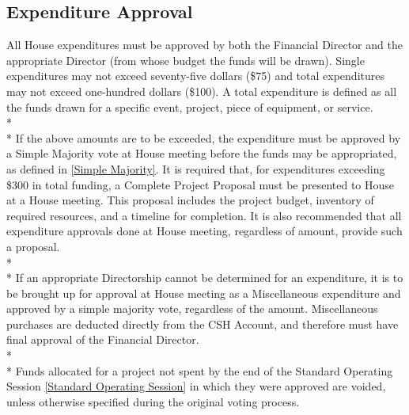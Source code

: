 \documentclass{article}
\newcommand{\bsection}[1]{\subsection{#1} \label{#1}}
\begin{document}
\bsection{Expenditure Approval}
All House expenditures must be approved by both the Financial Director and the appropriate Director (from whose budget the funds will be drawn). Single expenditures may not exceed seventy-five dollars (\$75) and total expenditures may not exceed one-hundred dollars (\$100). A total expenditure is defined as all the funds drawn for a specific event, project, piece of equipment, or service.
\\* \\*
If the above amounts are to be exceeded, the expenditure must be approved by a Simple Majority vote at House meeting before the funds may be appropriated, as defined in \ref{Simple Majority}. It is required that, for expenditures exceeding \$300 in total funding, a Complete Project Proposal must be presented to House at a House meeting. This proposal includes the project budget, inventory of required resources, and a timeline for completion. It is also recommended that all expenditure approvals done at House meeting, regardless of amount, provide such a proposal.
\\* \\*
If an appropriate Directorship cannot be determined for an expenditure, it is to be brought up for approval at House meeting as a Miscellaneous expenditure and approved by a simple majority vote, regardless of the amount. Miscellaneous purchases are deducted directly from the CSH Account, and therefore must have final approval of the Financial Director.
\\* \\*
Funds allocated for a project not spent by the end of the Standard Operating Session \ref{Standard Operating Session} in which they were approved are voided, unless otherwise specified during the original voting process.
\end{document}

